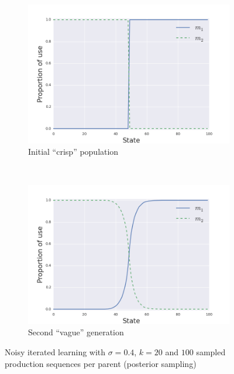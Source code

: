 \documentclass[10pt,a4paper]{article}
\begin{document}
\begin{figure}[ht]
  \centering
  \begin{subfigure}[b]{0.45\textwidth}
    \includegraphics[scale=0.4]{../code/plots/vag-gen0.png}
    \caption{Initial ``crisp'' population}
  \end{subfigure}
  ~
   \begin{subfigure}[b]{0.45\textwidth}
    \includegraphics[scale=0.4]{../code/plots/vag-gen1.png}
    \caption{Second ``vague'' generation}
  \end{subfigure}
  \caption{Noisy iterated learning with $\sigma = 0.4$, $k = 20$ and $100$ sampled production sequences per parent (posterior sampling)}
  \label{fig:vag}
\end{figure}
 
\end{document}
